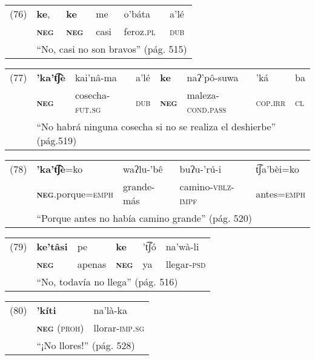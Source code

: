 {\setmainfont{Charis SIL} 

\begin{tabular}{llllll}
(76) & \textbf{ke}, & \textbf{ke} & me & o'báta & a'lé \\
& \textsc{\textbf{neg}} & \textsc{\textbf{neg}} & casi & feroz.\textsc{pl} & \textsc{dub}\\
& \multicolumn{5}{l}{``No, casi no son bravos'' (pág. 515)}
\end{tabular} \vspace{0.3cm}

\begin{tabular}{llllllll}
(77) & \textbf{'ka't͡ʃè} & kai'nâ-ma & a'lé & \textbf{ke} & naʔ'pô-suwa & 'ká & ba \\
& \textsc{\textbf{neg}} & cosecha-\textsc{fut.sg} & \textsc{dub} & \textsc{\textbf{neg}} & maleza-\textsc{cond.pass} & \textsc{cop.irr} & \textsc{cl} \\
& \multicolumn{7}{l}{``No habrá ninguna cosecha si no se realiza el deshierbe'' (pág.519)}
\end{tabular} \vspace{0.3cm}

\begin{tabular}{lllll}
(78) & \textbf{'ka't͡ʃè}=ko & waʔlu-'bê & buʔu-'rú-i & t͡ʃa'bèi=ko  \\
& \textsc{\textbf{neg}}.porque=\textsc{emph} & grande-más & camino-\textsc{vblz-impf} & antes=\textsc{emph} \\
& \multicolumn{4}{l}{``Porque antes no había camino grande'' (pág. 520)}
\end{tabular} \vspace{0.3cm}

\begin{tabular}{llllll}
(79) & \textbf{ke'tâsi} & pe & \textbf{ke} & 't͡ʃó & na'wà-li \\
& \textsc{\textbf{neg}} & apenas & \textsc{\textbf{neg}} & ya & llegar-\textsc{psd} \\
& \multicolumn{5}{l}{``No, todavía no llega'' (pág. 516)}
\end{tabular} \vspace{0.3cm}

\begin{tabular}{lll}
(80) & \textbf{'kíti} & na'là-ka \\
& \textsc{\textbf{neg} (proh)} & llorar-\textsc{imp.sg}\\
& \multicolumn{2}{l}{``¡No llores!'' (pág. 528)}
\end{tabular} \vspace{0.5cm}

}


